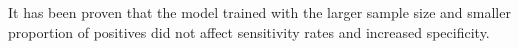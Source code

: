 It has been proven that the model trained with the larger sample size and smaller proportion of positives did not affect sensitivity rates and increased specificity. 



%
%
%
%
%
%
%
